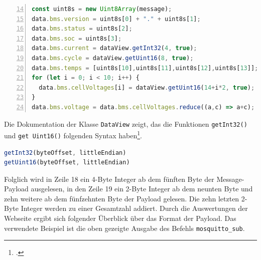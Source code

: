 \begin{lstlisting}[language=JavaScript,numbers=left,xleftmargin=\dimexpr2.5em-1pt,framexleftmargin=2em,firstnumber=14,label={lst:bms-reverse},caption=Inhalt der Webpack Datei \texttt{bmsReceivers.ts}]
const uint8s = new Uint8Array(message);
data.bms.version = uint8s[0] + "." + uint8s[1];
data.bms.status = uint8s[2];
data.bms.soc = uint8s[3];
data.bms.current = dataView.getInt32(4, true);
data.bms.cycle = dataView.getUint16(8, true);
data.bms.temps = [uint8s[10],uint8s[11],uint8s[12],uint8s[13]];
for (let i = 0; i < 10; i++) {
  data.bms.cellVoltages[i] = dataView.getUint16(14+i*2, true);
}
data.bms.voltage = data.bms.cellVoltages.reduce((a,c) => a+c);
\end{lstlisting}

\noindent Die Dokumentation der Klasse \texttt{DataView} zeigt, das die Funktionen \texttt{get\allowbreak Int32()} und \texttt{get\- Uint16()}
folgenden Syntax haben\footcite{dataview}.

\begin{lstlisting}[language=JavaScript]
getInt32(byteOffset, littleEndian)
getUint16(byteOffset, littleEndian)
\end{lstlisting}

Folglich wird in Zeile \num{18} ein \num{4}-Byte Integer ab dem fünften Byte der Message-Payload ausgelesen, in den Zeile
\num{19} ein \num{2}-Byte Integer ab dem neunten Byte und zehn weitere ab dem fünfzehnten Byte der Payload gelesen.
Die zehn letzten \num{2}-Byte Integer werden zu einer Gesamtzahl addiert.
Durch die Auswertungen der Webseite ergibt sich folgender Überblick über das Format der Payload.
Das verwendete Beispiel ist die oben gezeigte Ausgabe des Befehls \texttt{mosquitto\_\allowbreak sub}.

